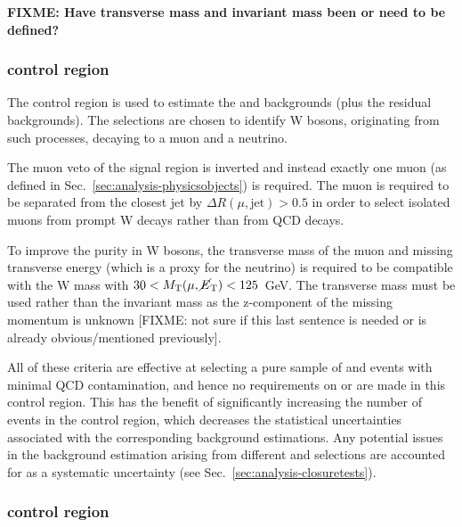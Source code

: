 
\textbf{FIXME: Have transverse mass and invariant mass been or need to be 
defined?}

\subsubsection{\mj control region}

The \mj control region is used to estimate the \wlj and \ttbar backgrounds 
(plus the residual backgrounds).
The selections are chosen to identify W bosons, originating from such 
processes, decaying to a muon and a neutrino. 

The muon veto of the signal 
region is inverted and instead exactly one muon (as defined in 
Sec.~\ref{sec:analysis-physicsobjects}) is required. The muon is required to be 
separated from the closest jet by $\Delta R(\mu,\mathrm{jet}) > 0.5$ in order 
to select isolated muons from prompt W decays rather than from QCD decays.

To 
improve the purity in W bosons, the transverse mass of the muon and missing 
transverse energy (which 
is a proxy for the neutrino) is required to be compatible with the W mass with 
$30 < M_{\mathrm{T}}(\mu,\mbox{$\cancel{E}_\text{T}$}) < 125$~GeV. The transverse mass must be used 
rather than the invariant mass as the 
z-component of the missing momentum is unknown [FIXME: not sure if this last 
sentence is needed or is already obvious/mentioned previously]. 

All of these 
criteria are effective at selecting a pure sample of \wlj and \ttbar events 
with minimal QCD contamination, and hence no requirements on \alphat or \bdphi 
are made in this control region. This has the benefit of significantly 
increasing the number of events in the control region, which decreases the 
statistical uncertainties associated with the corresponding background 
estimations. Any potential issues in the background estimation arising from 
different \alphat and \bdphi selections are accounted for as a systematic 
uncertainty (see Sec.~\ref{sec:analysis-closuretests}).

\subsubsection{\mmj control region}

